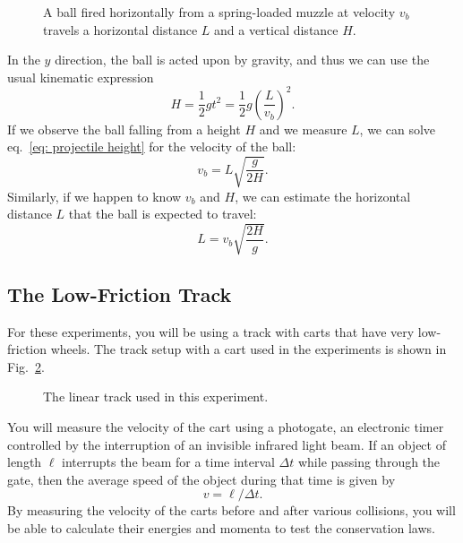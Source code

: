 \documentclass[addpoints]{physlabs}
\begin{document}
\begin{labsection}
\begin{theory}
    \begin{figure}[ht]
        \centering
        
        \caption{A ball fired horizontally from a spring-loaded muzzle at velocity $v_b$ travels a horizontal distance $L$ and a vertical distance $H$.}
        \label{fig: projectile motion}
    \end{figure}

    In the $y$ direction, the ball is acted upon by gravity, and thus we can use the usual kinematic expression
    \begin{equation}\label{eq: projectile height}
        H = \frac{1}{2}gt^2 = \frac{1}{2}g\left(\frac{L}{v_b}\right)^2.
    \end{equation}
    If we observe the ball falling from a height $H$ and we measure $L$, we can solve eq.~\ref{eq: projectile height} for the velocity of the ball:
    \begin{equation}\label{eq: projectile velocity}
        v_b = L\sqrt{\frac{g}{2H}}.
    \end{equation}
    Similarly, if we happen to know $v_b$ and $H$, we can estimate the horizontal distance $L$ that the ball is expected to travel:
    \begin{equation}\label{eq: projectile length}
        L = v_b\sqrt{\frac{2H}{g}}.
    \end{equation}

\end{theory}

\begin{experiment}

    \subsection*{The Low-Friction Track}

    For these experiments, you will be using a track with carts that have very low-friction wheels. The track setup with a cart used in the experiments is shown in Fig.~\ref{fig: linear track}.

    \begin{figure}[ht]
        \centering
        
        \caption{The linear track used in this experiment.}
        \label{fig: linear track}
    \end{figure}
    
    You will measure the velocity of the cart using a photogate, an electronic timer controlled by the interruption of an invisible infrared light beam. If an object of length $\ell$ interrupts the beam for a time interval $\Delta t$ while passing through the gate, then the average speed of the object during that time is given by
    \begin{equation}
        v = \ell/\Delta t.
    \end{equation}
    By measuring the velocity of the carts before and after various collisions, you will be able to calculate their energies and momenta to test the conservation laws.


\end{experiment}
\end{labsection}
\end{document}
